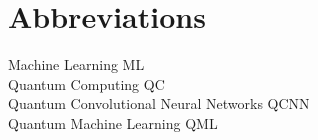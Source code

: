 
\section*{Abbreviations}
\large 
Machine Learning \hfill ML\\
Quantum Computing \hfill QC\\
Quantum Convolutional Neural Networks \hfill QCNN\\
Quantum Machine Learning \hfill QML\\
